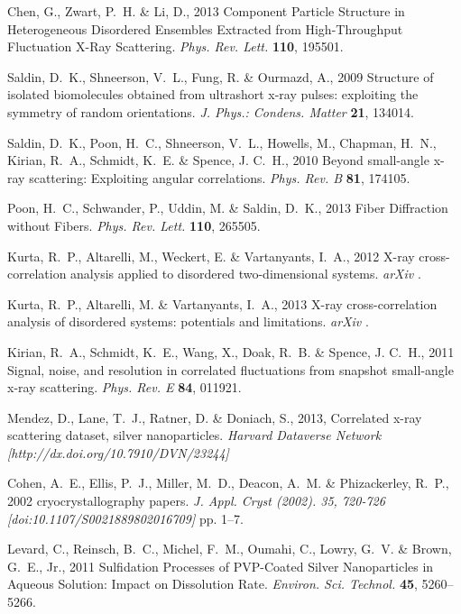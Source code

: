 \documentclass [11pt,fleqn]{article}
\begin{document}
\begin{thebibliography}{10}
Chen, G., Zwart, P.~H. \& Li, D., 2013 {Component Particle Structure in
  Heterogeneous Disordered Ensembles Extracted from High-Throughput Fluctuation
  X-Ray Scattering}.
\newblock \emph{Phys. Rev. Lett.} \textbf{110}, 195501.

Saldin, D.~K., Shneerson, V.~L., Fung, R. \& Ourmazd, A., 2009 {Structure of
  isolated biomolecules obtained from ultrashort x-ray pulses: exploiting the
  symmetry of random orientations}.
\newblock \emph{J. Phys.: Condens. Matter} \textbf{21}, 134014.

Saldin, D.~K., Poon, H.~C., Shneerson, V.~L., Howells, M., Chapman, H.~N.,
  Kirian, R.~A., Schmidt, K.~E. \& Spence, J. C.~H., 2010 {Beyond small-angle
  x-ray scattering: Exploiting angular correlations}.
\newblock \emph{Phys. Rev. B} \textbf{81}, 174105.

Poon, H.~C., Schwander, P., Uddin, M. \& Saldin, D.~K., 2013 {Fiber Diffraction
  without Fibers}.
\newblock \emph{Phys. Rev. Lett.} \textbf{110}, 265505.

Kurta, R.~P., Altarelli, M., Weckert, E. \& Vartanyants, I.~A., 2012 {X-ray
  cross-correlation analysis applied to disordered two-dimensional systems}.
\newblock \emph{arXiv} .

Kurta, R.~P., Altarelli, M. \& Vartanyants, I.~A., 2013 {X-ray
  cross-correlation analysis of disordered systems: potentials and
  limitations}.
\newblock \emph{arXiv} .

Kirian, R.~A., Schmidt, K.~E., Wang, X., Doak, R.~B. \& Spence, J. C.~H., 2011
  {Signal, noise, and resolution in correlated fluctuations from snapshot
  small-angle x-ray scattering}.
\newblock \emph{Phys. Rev. E} \textbf{84}, 011921.

Mendez, D., Lane, T.~J., Ratner, D. \& Doniach, S., 2013, {
Correlated x-ray scattering dataset, silver nanoparticles}.
\newblock \emph{Harvard Dataverse Network [http://dx.doi.org/10.7910/DVN/23244]}

Cohen, A.~E., Ellis, P.~J., Miller, M.~D., Deacon, A.~M. \& Phizackerley,
  R.~P., 2002 {cryocrystallography papers}.
\newblock \emph{J. Appl. Cryst (2002). 35, 720-726
  [doi:10.1107/S0021889802016709]} pp. 1--7.

Levard, C., Reinsch, B.~C., Michel, F.~M., Oumahi, C., Lowry, G.~V. \& Brown,
  G.~E., Jr., 2011 {Sulfidation Processes of PVP-Coated Silver Nanoparticles in
  Aqueous Solution: Impact on Dissolution Rate}.
\newblock \emph{Environ. Sci. Technol.} \textbf{45}, 5260--5266.


\end{thebibliography}
\end{document}
